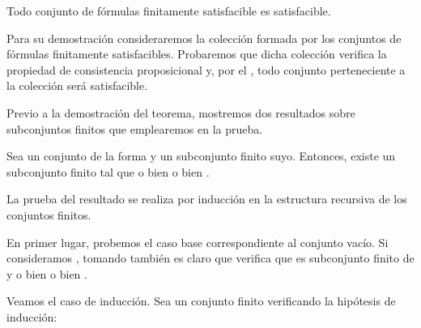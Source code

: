 \begin{isabellebody}
\begin{isamarkuptext}
  \begin{teorema}
    Todo conjunto de fórmulas finitamente satisfacible es satisfacible.
  \end{teorema}

  Para su demostración consideraremos la colección formada por los conjuntos de fórmulas finitamente 
  satisfacibles. Probaremos que dicha colección verifica la propiedad de consistencia proposicional
  y, por el , todo conjunto perteneciente a la colección será
  satisfacible.

  Previo a la demostración del teorema, mostremos dos resultados sobre subconjuntos finitos que
  emplearemos en la prueba.

  \begin{lema}
    Sea un conjunto de la forma  y  un subconjunto finito suyo. Entonces,
    existe un subconjunto finito  tal que o bien  o bien .
  \end{lema}

  \begin{demostracion}
    La prueba del resultado se realiza por inducción en la estructura recursiva de los conjuntos 
    finitos.

    En primer lugar, probemos el caso base correspondiente al conjunto vacío. Si consideramos 
    , tomando también  es claro que verifica que es subconjunto finito de 
    y o bien  o bien .

    Veamos el caso de inducción. Sea  un conjunto finito verificando la hipótesis de inducción:
    


\end{demostracion}
\end{isamarkuptext}
\end{isabellebody}
